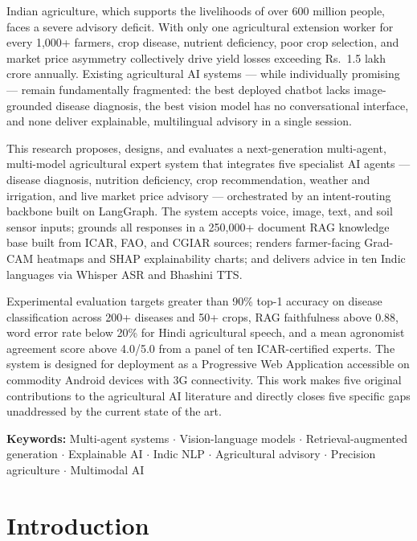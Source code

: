 \documentclass[12pt,a4paper]{article}
\providecommand{\textrupee}{Rs.~}
\begin{document}
Indian agriculture, which supports the livelihoods of over 600 million people, faces a severe advisory deficit. With only one agricultural extension worker for every 1,000+ farmers, crop disease, nutrient deficiency, poor crop selection, and market price asymmetry collectively drive yield losses exceeding \textrupee{}1.5 lakh crore annually. Existing agricultural AI systems --- while individually promising --- remain fundamentally fragmented: the best deployed chatbot lacks image-grounded disease diagnosis, the best vision model has no conversational interface, and none deliver explainable, multilingual advisory in a single session.

This research proposes, designs, and evaluates a next-generation multi-agent, multi-model agricultural expert system that integrates five specialist AI agents --- disease diagnosis, nutrition deficiency, crop recommendation, weather and irrigation, and live market price advisory --- orchestrated by an intent-routing backbone built on LangGraph. The system accepts voice, image, text, and soil sensor inputs; grounds all responses in a 250,000+ document RAG knowledge base built from ICAR, FAO, and CGIAR sources; renders farmer-facing Grad-CAM heatmaps and SHAP explainability charts; and delivers advice in ten Indic languages via Whisper ASR and Bhashini TTS.

Experimental evaluation targets greater than 90\% top-1 accuracy on disease classification across 200+ diseases and 50+ crops, RAG faithfulness above 0.88, word error rate below 20\% for Hindi agricultural speech, and a mean agronomist agreement score above 4.0/5.0 from a panel of ten ICAR-certified experts. The system is designed for deployment as a Progressive Web Application accessible on commodity Android devices with 3G connectivity. This work makes five original contributions to the agricultural AI literature and directly closes five specific gaps unaddressed by the current state of the art.

\vspace{0.3cm}
\noindent\textbf{Keywords:} Multi-agent systems $\cdot$ Vision-language models $\cdot$ Retrieval-augmented generation $\cdot$ Explainable AI $\cdot$ Indic NLP $\cdot$ Agricultural advisory $\cdot$ Precision agriculture $\cdot$ Multimodal AI

\clearpage
\tableofcontents
\newpage
\listoffigures
\clearpage
\section{Introduction}
\end{document}
